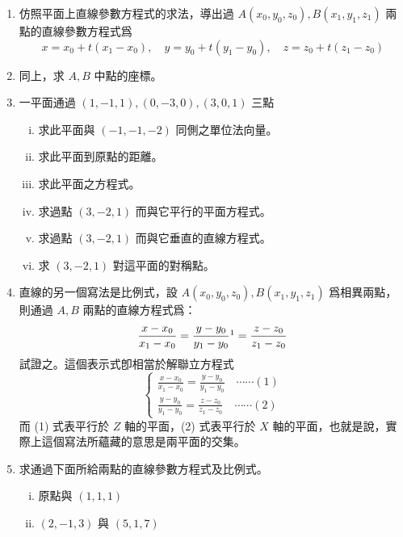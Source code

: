 \begin{enumerate}
\begin{figure}[H]
  \caption{空間笛沙格定理}
  \label{fig:4-75}
  \end{figure}

\item 仿照平面上直線參數方程式的求法，導出過 $A(x_0, y_0, z_0), B(x_1, y_1, z_1)$ 兩點的直線參數方程式爲
\[
x = x_0 + t(x_1 - x_0), \quad y = y_0 + t(y_1 - y_0), \quad z = z_0 + t(z_1 - z_0)
\]

\item 同上，求 $A, B$ 中點的座標。

\item 一平面通過 $(1, -1, 1), (0, -3, 0), (3, 0, 1)$ 三點
  \begin{enumerate}[(i)]
    \item 求此平面與 $(-1, -1, -2)$ 同側之單位法向量。
    \item 求此平面到原點的距離。
    \item 求此平面之方程式。
    \item 求過點 $(3, -2, 1)$ 而與它平行的平面方程式。
    \item 求過點 $(3, -2, 1)$ 而與它垂直的直線方程式。
    \item 求 $(3, -2, 1)$ 對這平面的對稱點。
  \end{enumerate}

\item[*8.] 直線的另一個寫法是比例式，設 $A(x_0, y_0, z_0), B(x_1, y_1, z_1)$ 爲相異兩點，則通過 $A, B$ 兩點的直線方程式爲：
\[
\frac{x - x_0}{x_1 - x_0} = \frac{y - y_0}{y_1 - y_0}\footnotemark = \frac{z - z_0}{z_1 - z_0}
\]
%
試證之。這個表示式卽相當於解聯立方程式
\[
\begin{cases}
\frac{x - x_0}{x_1 - x_0} = \frac{y - y_0}{y_1 - y_0} \quad \cdots\cdots (1) \\
\frac{y - y_0}{y_1 - y_0} = \frac{z - z_0}{z_1 - z_0} \quad \cdots\cdots (2)
\end{cases}
\]
而 (1) 式表平行於 $Z$ 軸的平面，(2) 式表平行於 $X$ 軸的平面，也就是說，實際上這個寫法所蘊藏的意思是兩平面的交集。

\item[*9.] 求通過下面所給兩點的直線參數方程式及比例式。
  \begin{enumerate}[(i)]
    \item 原點與 $(1, 1, 1)$
    \item $(2, -1, 3)$ 與 $(5, 1, 7)$
  \end{enumerate}


\end{enumerate}
